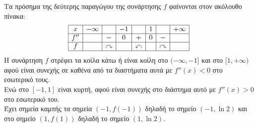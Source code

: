 Τα πρόσημα της δεύτερης παραγώγου της συνάρτησης $f$ φαίνονται στον ακόλουθο πίνακα:
\[
\begin{array}{|c|c|c|c|c|c|c|c|}
\hline
x & -\infty & & -1 & & 1 & & +\infty \\
\hline
f'' & & - & 0 & + & 0 & - & \\
\hline
f & & \curvearrowright & ~ & \curvearrowleft & ~ & \curvearrowright & \\
\hline
\end{array}
\]
Η συνάρτηση $f$ στρέφει τα κοίλα κάτω ή είναι κοίλη στο $(-\infty, -1]$ και στο $[1, +\infty)$ αφού είναι συνεχής σε καθένα από τα διαστήματα αυτά με $f''(x) < 0$ στο εσωτερικό τους. \\
Ενώ στο $[-1, 1]$ είναι κυρτή, αφού είναι συνεχής στο διάστημα αυτό με $f''(x) > 0$ στο εσωτερικό του. \\
Έχει σημεία καμπής τα σημεία $(-1, f(-1))$ δηλαδή το σημείο $(-1, \ln2)$ και στο σημείο $(1, f(1))$ δηλαδή το σημείο $(1, \ln2)$.